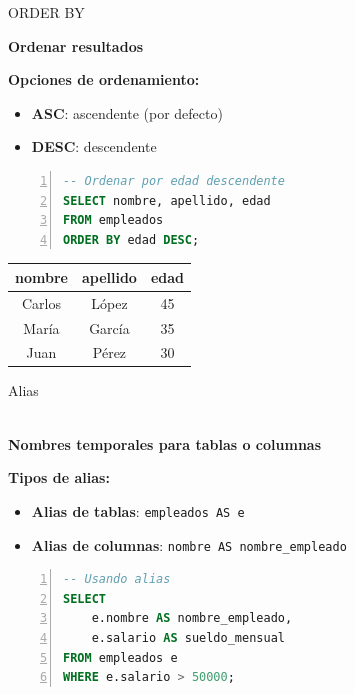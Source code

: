 \documentclass{beamer}
\begin{document}
\begin{frame}[fragile]{ORDER BY}
    \begin{center}
        \textbf{Ordenar resultados}
    \end{center}
    
    \textbf{Opciones de ordenamiento:}
    \begin{itemize}
        \item[{\makebox[1em][c]{\textcolor{black}{\faArrowUp}}}] \textbf{ASC}: ascendente (por defecto)
        \item[{\makebox[1em][c]{\textcolor{black}{\faArrowDown}}}] \textbf{DESC}: descendente
    \end{itemize}

    \begin{lstlisting}[language=SQL, numbers=left, numbersep=5pt]
-- Ordenar por edad descendente
SELECT nombre, apellido, edad
FROM empleados
ORDER BY edad DESC;
    \end{lstlisting}
    
    \vspace{0.3cm}
    
    \begin{center}
        \begin{tabular}{ccc}
            \toprule
            nombre & apellido & edad \\
            \midrule
            Carlos & López & 45 \\
            María & García & 35 \\
            Juan & Pérez & 30 \\
            \bottomrule
        \end{tabular}
    \end{center}
\end{frame}

\begin{frame}[fragile]{Alias}
    \begin{center}
        {\Large \faTag}\\[0.2cm]
        \textbf{Nombres temporales para tablas o columnas}
    \end{center}
    
    \vspace{0.3cm}
    
    \textbf{Tipos de alias:}
    \begin{itemize}
        \item[{\makebox[1em][c]{\textcolor{black}{\faTable}}}] \textbf{Alias de tablas}: \texttt{empleados AS e}
        \item[{\makebox[1em][c]{\textcolor{black}{\faColumns}}}] \textbf{Alias de columnas}: \texttt{nombre AS nombre\_empleado}
    \end{itemize}
    
    \vspace{0.3cm}
    
    \begin{lstlisting}[language=SQL, numbers=left, numbersep=5pt]
-- Usando alias
SELECT 
    e.nombre AS nombre_empleado,
    e.salario AS sueldo_mensual
FROM empleados e
WHERE e.salario > 50000;
    \end{lstlisting}
\end{frame}
\end{document}
